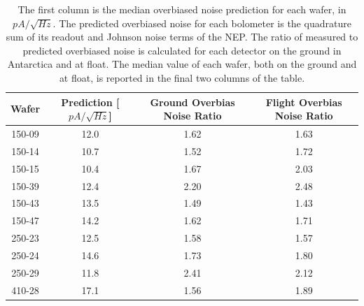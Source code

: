 \begin{table}[ht!]
\begin{center}
\begin{tabular}{|c|c|c|c|}
\hline  Wafer & Prediction [$pA/\sqrt{Hz}$]& Ground Overbias Noise Ratio & Flight Overbias Noise Ratio \\
\hline 150-09 & 12.0 & 1.62 & 1.63 \\
\hline 150-14 & 10.7 & 1.52 & 1.72 \\
\hline 150-15 & 10.4 & 1.67 & 2.03 \\
\hline 150-39 & 12.4 & 2.20 & 2.48 \\
\hline 150-43 & 13.5 & 1.49 & 1.43 \\
\hline 150-47 & 14.2 & 1.62 & 1.71 \\
\hline 250-23 & 12.5 & 1.58 & 1.57 \\
\hline 250-24 & 14.6 & 1.73 & 1.80 \\
\hline 250-29 & 11.8 & 2.41 & 2.12 \\
\hline 410-28 & 17.1 & 1.56 & 1.89 \\
\hline
\end{tabular}
\end{center}
\caption{The first column is the median overbiased noise prediction for each wafer, in $pA/\sqrt{Hz}$. The predicted overbiased noise for each bolometer is the quadrature sum of its readout and Johnson noise terms of the \ac{NEP}. The ratio of measured to predicted overbiased noise is calculated for each detector on the ground in Antarctica and at float. The median value of each wafer, both on the ground and at float, is reported in the final two columns of the table.}
\label{overbias_noise_table}
\end{table}%



